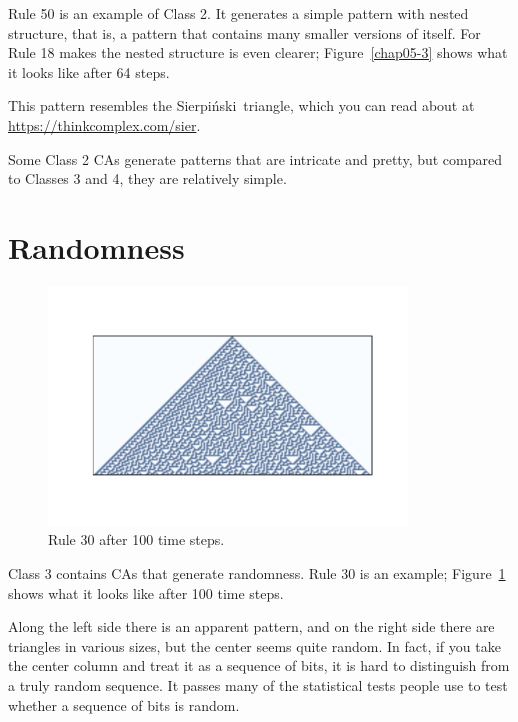 \documentclass[12pt]{book}
\theoremstyle{exercise}
\begin{document}

Rule 50 is an example of Class 2.  It generates a simple pattern with
nested structure, that is, a pattern that contains many smaller versions
of itself.  For Rule 18 makes the nested structure is even clearer;
Figure~\ref{chap05-3} shows what it looks like after 64 steps.


\newcommand{\Sierpinski}{Sierpi\'{n}ski}

This pattern resembles the \Sierpinski~triangle, which
you can read about at \url{https://thinkcomplex.com/sier}.


Some Class 2 CAs generate patterns that are intricate and
pretty, but compared to Classes 3 and 4, they are relatively
simple.


\section{Randomness}

\begin{figure}
\centerline{\includegraphics[height=2.5in]{figs/chap05-4.pdf}}
\caption{Rule 30 after 100 time steps.}
\label{chap05-4}
\end{figure}

Class 3 contains CAs that generate randomness.
Rule 30 is an example; Figure~\ref{chap05-4} shows what it looks like
after 100 time steps.


Along the left side there is an apparent pattern, and on the right
side there are triangles in various sizes, but the center seems
quite random.  In fact, if you take the center column and treat it as a
sequence of bits, it is hard to distinguish from a truly random
sequence.  It passes many of the statistical tests people use
to test whether a sequence of bits is random.
\end{document}
